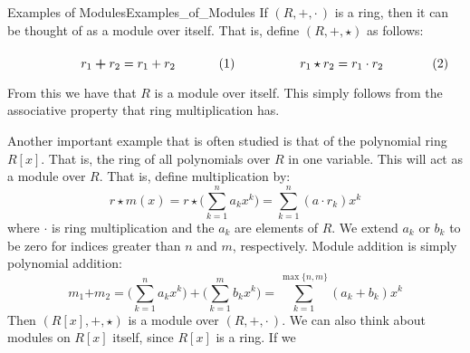     \begin{fexample}{Examples of Modules}{Examples_of_Modules}
        If $(R,+,\cdot\,)$ is a ring, then it can be thought of as a module over
        itself. That is, define $(R,\boldsymbol{+},\star)$ as follows:
        \par
        \begin{subequations}
            \begin{minipage}[b]{0.49\textwidth}
                \begin{equation}
                    r_{1}\boldsymbol{+}r_{2}=r_{1}+r_{2}
                \end{equation}
            \end{minipage}
            \hfill
            \begin{minipage}[b]{0.49\textwidth}
                \begin{equation}
                    r_{1}\star{r}_{2}=r_{1}\cdot{r}_{2}
                \end{equation}
            \end{minipage}
        \end{subequations}
        \par\vspace{2.5ex}
        From this we have that $R$ is a module over itself. This simply follows
        from the associative property that ring multiplication has.
    \end{fexample}
    Another important example that is often studied is that of the polynomial
    ring $R[x]$. That is, the ring of all polynomials over $R$ in one variable.
    This will act as a module over $R$. That is, define multiplication by:
    \begin{equation}
        r\star{m}(x)
        =r\star\Big(\sum_{k=1}^{n}a_{k}x^{k}\Big)
        =\sum_{k=1}^{n}(a\cdot{r}_{k})x^{k}
    \end{equation}
    where $\cdot$ is ring multiplication and the $a_{k}$ are elements of $R$.
    We extend $a_{k}$ or $b_{k}$ to be zero for indices greater than $n$ and
    $m$, respectively. Module addition is simply polynomial addition:
    \begin{equation}
        m_{1}\boldsymbol{+}m_{2}
        =\Big(\sum_{k=1}^{n}a_{k}x^{k}\Big)+\Big(\sum_{k=1}^{m}b_{k}x^{k}\Big)
        =\sum_{k=1}^{\max\{n,m\}}(a_{k}+b_{k})x^{k}
    \end{equation}
    Then $(R[x],\boldsymbol{+},\star)$ is a module over $(R,+,\cdot\,)$. We can
    also think about modules on $R[x]$ itself, since $R[x]$ is a ring. If we
